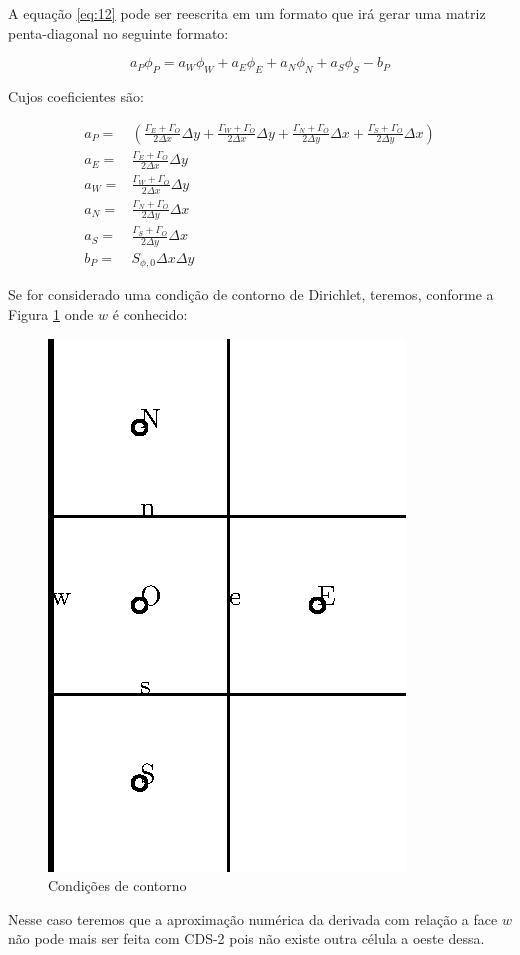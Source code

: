 A equação \ref{eq:12} pode ser reescrita em um formato que irá gerar uma matriz penta-diagonal no seguinte formato:

\begin{equation}
    a_P \phi_P = a_W \phi_W + a_E \phi_E + a_N \phi_N + a_S \phi_S - b_P
\end{equation}

Cujos coeficientes são:

\begin{eqnarray}
    a_P =& \left( \frac{\Gamma_E + \Gamma_O}{2 \Delta x} \Delta y + \frac{\Gamma_W + \Gamma_O}{2 \Delta x} \Delta y + \frac{\Gamma_N + \Gamma_O}{2 \Delta y} \Delta x + \frac{\Gamma_S + \Gamma_O}{2 \Delta y} \Delta x \right)\\
    a_E =& \frac{\Gamma_E + \Gamma_O}{2 \Delta x} \Delta y\\
    a_W =& \frac{\Gamma_W + \Gamma_O}{2 \Delta x} \Delta y\\
    a_N =& \frac{\Gamma_N + \Gamma_O}{2 \Delta y} \Delta x\\
    a_S =& \frac{\Gamma_S + \Gamma_O}{2 \Delta y} \Delta x\\
    b_P =& S_{\phi,0} \Delta x \Delta y
\end{eqnarray}

Se for considerado uma condição de contorno de Dirichlet, teremos, conforme a Figura  \ref{fig:fig2} onde $w$ é conhecido:

\begin{figure}[h!]
    \centering
    \includegraphics[width=0.4\linewidth]{fig/Figura2.eps}
    \caption{Condições de contorno}
    \label{fig:fig2}
\end{figure}

Nesse caso teremos que a aproximação numérica da derivada com relação a face $w$ não pode mais ser feita com CDS-2 pois não existe outra célula a oeste dessa.

